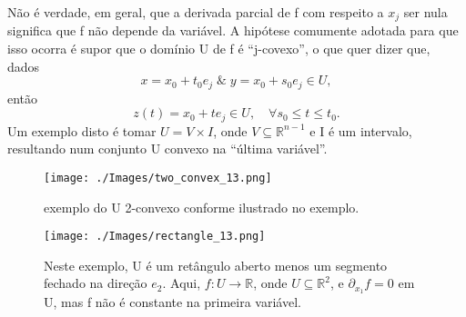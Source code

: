 \documentclass[../distribution_theory_notes.tex]{subfiles}
\begin{document}
Não é verdade, em geral, que a derivada parcial de f com respeito a \(x_{j}\) ser nula significa que f não depende da variável. A hipótese comumente adotada para que isso ocorra é supor que o domínio U de f é ``j-covexo'', o que quer dizer que, dados
\[
	x=x_{0}+t_{0}e_{j}\;\&\; y=x_{0}+s_{0}e_{j}\in U,
\]
então
\[
	z(t)=x_{0}+te_{j}\in U,\quad \forall s_{0}\leq t\leq t_{0}.
\]
Um exemplo disto é tomar \(U = V \times I\), onde \(V\subseteq \mathbb{R}^{n-1}\) e I é um intervalo, resultando num conjunto U convexo na ``última variável''.
\begin{figure}[H]
	\begin{center}
		\texttt{[image: ./Images/two\_convex\_13.png]}
	\end{center}
	\caption{exemplo do U 2-convexo conforme ilustrado no exemplo.}
\end{figure}

\begin{figure}[H]
	\begin{center}
		\texttt{[image: ./Images/rectangle\_13.png]}
	\end{center}
	\caption{Neste exemplo, U é um retângulo aberto menos um segmento fechado na direção \(e_2\). Aqui, \(f:U\rightarrow \mathbb{R}\), onde \(U\subseteq \mathbb{R}^{2}\), e \(\partial_{x_1} f = 0\) em U, mas f não é constante na primeira variável.}
\end{figure}
\end{document}
